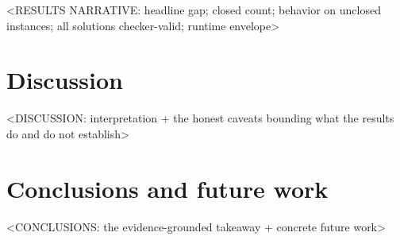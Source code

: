 \documentclass[11pt]{article}
\begin{document}
<RESULTS NARRATIVE: headline gap; closed count; behavior on unclosed instances;
all solutions checker-valid; runtime envelope>

\section{Discussion}
<DISCUSSION: interpretation + the honest caveats bounding what the results
do and do not establish>

\section{Conclusions and future work}
<CONCLUSIONS: the evidence-grounded takeaway + concrete future work>



\end{document}
